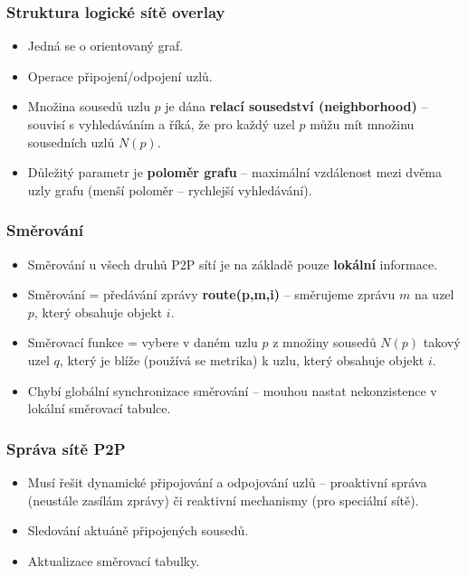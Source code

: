 \documentclass[11pt,a4paper]{article}
\begin{document}
\subsubsection{Struktura logické sítě overlay}
\begin{itemize}
\item Jedná se o orientovaný graf.
\item Operace připojení/odpojení uzlů.
\item Množina sousedů uzlu $p$ je dána \textbf{relací sousedství (neighborhood)} -- souvisí s vyhledáváním a říká, že pro každý uzel $p$ můžu mít množinu sousedních uzlů $N(p)$.
\item Důležitý parametr je \textbf{poloměr grafu} -- maximální vzdálenost mezi dvěma uzly grafu (menší poloměr -- rychlejší vyhledávání).
\end{itemize}

\subsubsection{Směrování}
\begin{itemize}
\item Směrování u všech druhů P2P sítí je na základě pouze \textbf{lokální} informace.
\item Směrování = předávání zprávy \textbf{route(p,m,i)} -- směrujeme zprávu $m$ na uzel $p$, který obsahuje objekt $i$.
\item Směrovací funkce = vybere v daném uzlu $p$ z množiny sousedů $N(p)$ takový uzel $q$, který je blíže (používá se metrika) k uzlu, který obsahuje objekt $i$.
\item Chybí globální synchronizace směrování -- mouhou nastat nekonzistence v lokální směrovací tabulce.
\end{itemize}

\subsubsection{Správa sítě P2P}
\begin{itemize}
\item Musí řešit dynamické připojování a odpojování uzlů -- proaktivní správa (neustále zasílám zprávy) či reaktivní mechanismy (pro speciální sítě).
\item Sledování aktuáně připojených sousedů.
\item Aktualizace směrovací tabulky.

\end{itemize}
\end{document}
